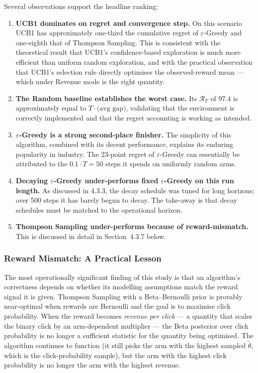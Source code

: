 Several observations support the headline ranking:

\begin{enumerate}
\item \textbf{UCB1 dominates on regret and convergence step.} On this scenario UCB1 has approximately one-third the cumulative regret of $\varepsilon$-Greedy and one-eighth that of Thompson Sampling. This is consistent with the theoretical result that UCB1's confidence-based exploration is much more efficient than uniform random exploration, and with the practical observation that UCB1's selection rule directly optimises the observed-reward mean --- which under Revenue mode is the right quantity.
\item \textbf{The Random baseline establishes the worst case.} Its $\mathcal{R}_T$ of $97.4$ is approximately equal to $T \cdot \text{(avg gap)}$, validating that the environment is correctly implemented and that the regret accounting is working as intended.
\item \textbf{$\varepsilon$-Greedy is a strong second-place finisher.} The simplicity of this algorithm, combined with its decent performance, explains its enduring popularity in industry. The 23-point regret of $\varepsilon$-Greedy can essentially be attributed to the $0.1 \cdot T = 50$ steps it spends on uniformly random arms.
\item \textbf{Decaying $\varepsilon$-Greedy under-performs fixed $\varepsilon$-Greedy on this run length.} As discussed in 4.3.3, the decay schedule was tuned for long horizons; over 500 steps it has barely begun to decay. The take-away is that decay schedules must be matched to the operational horizon.
\item \textbf{Thompson Sampling under-performs because of reward-mismatch.} This is discussed in detail in Section~4.3.7 below.
\end{enumerate}

\subsubsection{Reward Mismatch: A Practical Lesson}
The most operationally significant finding of this study is that an algorithm's correctness depends on whether its modelling assumptions match the reward signal it is given. Thompson Sampling with a Beta--Bernoulli prior is provably near-optimal when rewards are Bernoulli and the goal is to maximise click probability. When the reward becomes \emph{revenue per click} --- a quantity that scales the binary click by an arm-dependent multiplier --- the Beta posterior over click probability is no longer a sufficient statistic for the quantity being optimised. The algorithm continues to function (it still picks the arm with the highest sampled $\tilde{\theta}$, which is the click-probability sample), but the arm with the highest click probability is no longer the arm with the highest revenue.

